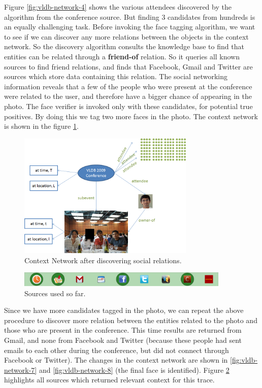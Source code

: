 Figure \ref{fig:vldb-network-4} shows the various attendees discovered by the algorithm from the conference source. But finding 3 candidates from hundreds is an equally challenging task. Before invoking the face tagging algorithm, we want to see if we can discover any more relations between the objects in the context network. So the discovery algorithm consults the knowledge base to find that entities can be related through a \textbf{friend-of} relation. So it queries all known sources to find friend relations, and finds that Facebook, Gmail and Twitter are sources which store data containing this relation. The social networking information reveals that a few of the people who were present at the conference were related to the user, and therefore have a bigger chance of appearing in the photo. The face verifier is invoked only with these candidates, for potential true positives. By doing this we tag two more faces in the photo. The context network is shown in the figure \ref{fig:vldb-network-6}.

\begin{figure}[h]
\centering
\includegraphics[width=0.75\textwidth]{media/chapter4/stacktrace/vldb-network-6.png}
\caption{Context Network after discovering social relations.}
\label{fig:vldb-network-6}
\end{figure}
\begin{figure}[h]
\centering
\includegraphics[width=0.9\textwidth]{media/chapter4/stacktrace/vldb-source-2.png}
\caption{Sources used so far.}
\label{fig:vldb-network-3}
\end{figure}

Since we have more candidates tagged in the photo, we can repeat the above procedure to discover more relation between the entities related to the photo and those who are present in the conference. This time results are returned from Gmail, and none from Facebook and Twitter (because these people had sent emails to each other during the conference, but did not connect through Facebook or Twitter). The changes in the context network are shown in \ref{fig:vldb-network-7} and \ref{fig:vldb-network-8} (the final face is identified). Figure \ref{fig:vldb-network-3} highlights all sources which returned relevant context for this trace. 

